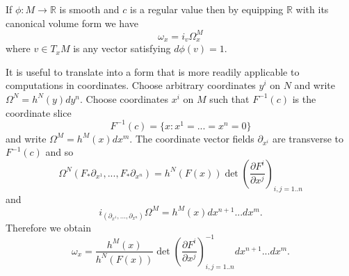 \begin{corollary}
If $\phi:M\rightarrow\mathbb{R}$ is smooth and $c$ is a regular value then by equipping $\mathbb{R}$ with its canonical volume form we have 
\begin{equation}
\omega_x=i_v\Omega^M_x
\end{equation}
where $v\in T_xM$ is any vector satisfying $d\phi(v)=1$.
\end{corollary}

It is useful to translate   into a form that is more readily applicable to computations in coordinates.  Choose arbitrary coordinates $y^i$ on $N$ and write $\Omega^N=h^N(y) dy^n$. Choose coordinates $x^i$ on $M$ such that $F^{-1}(c)$ is the coordinate slice
\begin{equation}
F^{-1}(c)=\{x:x^1=...=x^n=0\}
\end{equation}
and write $\Omega^M=h^M(x)dx^m$. The coordinate vector fields $\partial_{x^i}$ are transverse to $F^{-1}(c)$ and so
\begin{equation}
\Omega^N(F_*\partial_{x^1},...,F_*\partial_{x^n})=h^N(F(x))\det \left(\frac{\partial F^i}{\partial x^j}\right)_{i,j=1..n}
\end{equation}
and
\begin{equation}
i_{(\partial_{x^1},...,\partial_{x^n})}\Omega^M=h^M(x) dx^{n+1}...dx^m.
\end{equation}
Therefore we obtain
\begin{equation}\label{vol_form_coords}
\omega_x=\frac{h^M(x)}{h^N(F(x))}\det \left(\frac{\partial F^i}{\partial x^j}\right)^{-1}_{i,j=1..n}dx^{n+1}...dx^m.
\end{equation}

